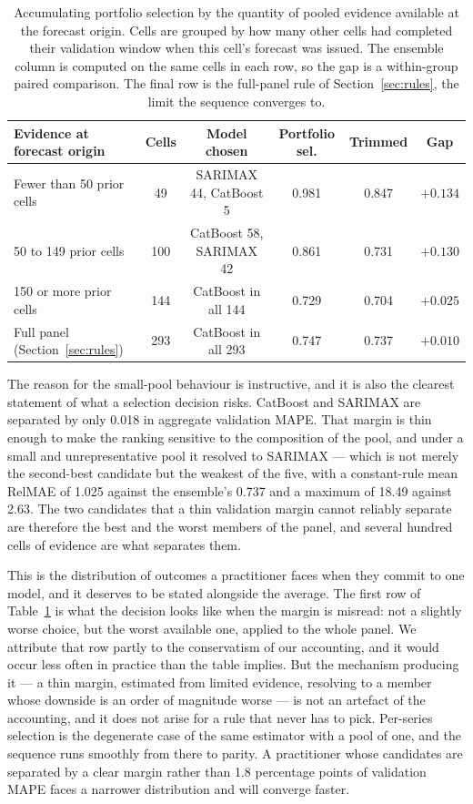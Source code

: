 \documentclass[11pt]{article}
\begin{document}
\begin{table}[htbp]\centering\small
\caption{Accumulating portfolio selection by the quantity of pooled evidence available at the forecast origin. Cells are grouped by how many other cells had completed their validation window when this cell's forecast was issued. The ensemble column is computed on the same cells in each row, so the gap is a within-group paired comparison. The final row is the full-panel rule of Section~\ref{sec:rules}, the limit the sequence converges to.}
\label{tab:pooling}
\begin{tabular}{lccccc}
\toprule
Evidence at forecast origin & Cells & Model chosen & Portfolio sel. & Trimmed & Gap \\
\midrule
Fewer than 50 prior cells & 49 & SARIMAX 44, CatBoost 5 & 0.981 & 0.847 & $+0.134$ \\
50 to 149 prior cells & 100 & CatBoost 58, SARIMAX 42 & 0.861 & 0.731 & $+0.130$ \\
150 or more prior cells & 144 & CatBoost in all 144 & 0.729 & 0.704 & $+0.025$ \\
\midrule
Full panel (Section~\ref{sec:rules}) & 293 & CatBoost in all 293 & 0.747 & 0.737 & $+0.010$ \\
\bottomrule
\end{tabular}
\end{table}

The reason for the small-pool behaviour is instructive, and it is also the clearest statement of what a selection decision risks. CatBoost and SARIMAX are separated by only 0.018 in aggregate validation MAPE. That margin is thin enough to make the ranking sensitive to the composition of the pool, and under a small and unrepresentative pool it resolved to SARIMAX --- which is not merely the second-best candidate but the weakest of the five, with a constant-rule mean RelMAE of 1.025 against the ensemble's 0.737 and a maximum of 18.49 against 2.63. The two candidates that a thin validation margin cannot reliably separate are therefore the best and the worst members of the panel, and several hundred cells of evidence are what separates them.

This is the distribution of outcomes a practitioner faces when they commit to one model, and it deserves to be stated alongside the average. The first row of Table~\ref{tab:pooling} is what the decision looks like when the margin is misread: not a slightly worse choice, but the worst available one, applied to the whole panel. We attribute that row partly to the conservatism of our accounting, and it would occur less often in practice than the table implies. But the mechanism producing it --- a thin margin, estimated from limited evidence, resolving to a member whose downside is an order of magnitude worse --- is not an artefact of the accounting, and it does not arise for a rule that never has to pick. Per-series selection is the degenerate case of the same estimator with a pool of one, and the sequence runs smoothly from there to parity. A practitioner whose candidates are separated by a clear margin rather than 1.8 percentage points of validation MAPE faces a narrower distribution and will converge faster.
\end{document}
